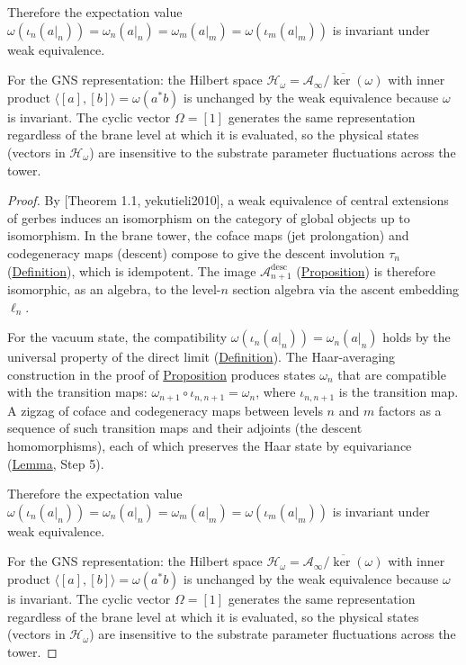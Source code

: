 \begin{proposition}
Therefore the expectation value
$\omega(\iota_n(a|_n)) = \omega_n(a|_n) = \omega_m(a|_m) =
\omega(\iota_m(a|_m))$
is invariant under weak equivalence.

For the GNS representation: the Hilbert space
$\mathcal{H}_\omega = \overline{\mathcal{A}_\infty / \ker(\omega)}$ with
inner product $\langle [a], [b] \rangle = \omega(a^* b)$ is unchanged by
the weak equivalence because $\omega$ is invariant.  The cyclic vector
$\Omega = [1]$ generates the same representation regardless of the brane
level at which it is evaluated, so the physical states (vectors in
$\mathcal{H}_\omega$) are insensitive to the substrate parameter
fluctuations across the tower.
\end{proposition}
\begin{proof}
By [Theorem 1.1, yekutieli2010], a weak equivalence of central
extensions of gerbes induces an isomorphism on the category of global
objects up to isomorphism.  In the brane tower, the coface maps (jet
prolongation) and codegeneracy maps (descent) compose to give the descent
involution $\tau_n$ (\hyperref[def:descent-involution]{Definition}), which is
idempotent.  The image $\mathcal{A}_{n+1}^{\mathrm{desc}}$
(\hyperref[prop:descent-eigenspaces]{Proposition}) is therefore isomorphic, as
an algebra, to the level-$n$ section algebra via the ascent embedding
$\ell_n$.

For the vacuum state, the compatibility
$\omega(\iota_n(a|_n)) = \omega_n(a|_n)$ holds by the universal property
of the direct limit (\hyperref[def:direct-limit-algebra]{Definition}).  The
Haar-averaging construction in the proof of
\hyperref[prop:vacuum-state]{Proposition} produces states $\omega_n$ that are
compatible with the transition maps:
$\omega_{n+1} \circ \iota_{n,n+1} = \omega_n$, where
$\iota_{n,n+1}$ is the transition map.  A zigzag of coface and
codegeneracy maps between levels $n$ and $m$ factors as a sequence of
such transition maps and their adjoints (the descent homomorphisms),
each of which preserves the Haar state by equivariance
(\hyperref[lem:descent]{Lemma}, Step 5).

Therefore the expectation value
$\omega(\iota_n(a|_n)) = \omega_n(a|_n) = \omega_m(a|_m) =
\omega(\iota_m(a|_m))$
is invariant under weak equivalence.

For the GNS representation: the Hilbert space
$\mathcal{H}_\omega = \overline{\mathcal{A}_\infty / \ker(\omega)}$ with
inner product $\langle [a], [b] \rangle = \omega(a^* b)$ is unchanged by
the weak equivalence because $\omega$ is invariant.  The cyclic vector
$\Omega = [1]$ generates the same representation regardless of the brane
level at which it is evaluated, so the physical states (vectors in
$\mathcal{H}_\omega$) are insensitive to the substrate parameter
fluctuations across the tower.
\end{proof}

